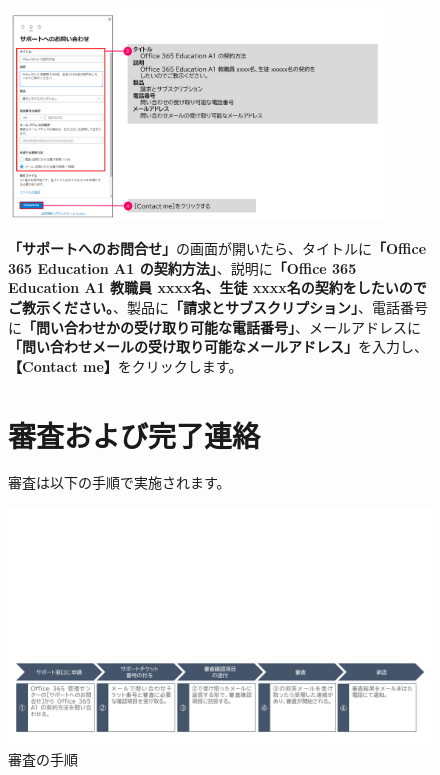 \begin{figure}[h]
    \begin{minipage}{0.6\textwidth}
        \includegraphics[width=10cm]{figures/O365A1_request02.png}
    \end{minipage}
    \begin{minipage}{0.4\textwidth}
       \textbf{「サポートへのお問合せ」}の画面が開いたら、タイトルに\textbf{「Office 365 Education A1 の契約方法」}、説明に\textbf{「Office 365 Education A1 教職員 xxxx名、生徒 xxxx名の契約をしたいのでご教示ください。}、製品に\textbf{「請求とサブスクリプション」}、電話番号に\textbf{「問い合わせかの受け取り可能な電話番号」}、メールアドレスに\textbf{「問い合わせメールの受け取り可能なメールアドレス」}を入力し、\textbf{【Contact me】}をクリックします。
    \end{minipage}
\end{figure}


\begin{figure}[t]
    \begin{minipage}{1.0\textwidth}
        \section{審査および完了連絡}
        \label{sec:Office365審査}
            審査は以下の手順で実施されます。
    \end{minipage}
\end{figure}

\begin{figure}[h]
    \centering
    \vspace{-6cm}
    \includegraphics[width=17cm]{figures/O365A1_review00.png}
    \caption{審査の手順}
    \label{fig:審査の手順}
\end{figure}


